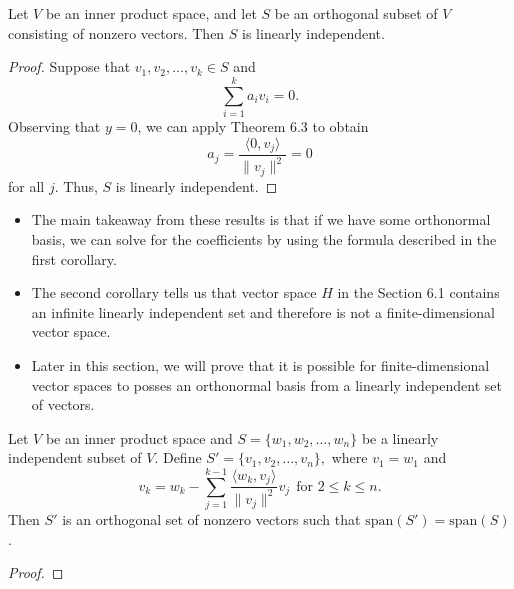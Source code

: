 \begin{corollary}
    Let \( V  \) be an inner product space, and let \( S  \) be an orthogonal subset of \( V  \) consisting of nonzero vectors. Then \( S  \) is linearly independent.
\end{corollary}

\begin{proof}
Suppose that \( {v}_{1}, {v}_{2}, \dots, {v}_{k} \in S  \) and 
\[  \sum_{ i=1  }^{ k  } {a}_{i} {v}_{i} = 0.  \]
Observing that \( y = 0  \), we can apply Theorem 6.3 to obtain
\[  {a}_{j} = \frac{ \langle 0 , {v}_{j} \rangle }{  \|{v}_{j}\|^{2} }  = 0\]
for all \( j  \). Thus, \( S  \) is linearly independent.
\end{proof} 

\begin{itemize}
    \item The main takeaway from these results is that if we have some orthonormal basis, we can solve for the coefficients by using the formula described in the first corollary.
    \item The second corollary tells us that vector space \( H  \) in the Section 6.1 contains an infinite linearly independent set and therefore is not a finite-dimensional vector space.
    \item Later in this section, we will prove that it is possible for finite-dimensional vector spaces to posses an orthonormal basis from a linearly independent set of vectors.
\end{itemize}

\begin{theorem}
    Let \( V  \) be an inner product space and \( S = \{ {w}_{1}, {w}_{2}, \dots, {w}_{n} \}  \) be a linearly independent subset of \( V  \). Define \( S' = \{ {v}_{1}, {v}_{2}, \dots, {v}_{n} \},  \) where \( {v}_{1} = {w}_{1} \) and
    \[  {v}_{k} = {w}_{k} - \sum_{ j=1 }^{ k - 1  } \frac{ \langle {w}_{k} , {v}_{j} \rangle }{ \|{v}_{j}\|^{2} } {v}_{j} \ \ \text{for } 2 \leq k \leq n. \]
    Then \( S'  \) is an orthogonal set of nonzero vectors such that \( \text{span}(S') = \text{span}(S) \).
\end{theorem}
\begin{proof}

\end{proof}



